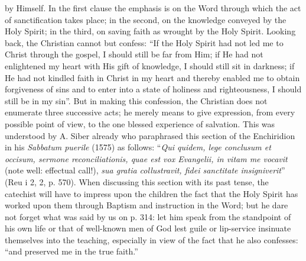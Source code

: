by Himself. In the first clause the emphasis is on the Word through which the act of sanctification takes place; in the second, on the knowledge conveyed by the Holy Spirit; in the third, on saving faith as wrought by the Holy Spirit. Looking back, the Christian cannot but confess: “If the Holy Spirit had not led me to Christ through the gospel, I should still be far from Him; if He had not enlightened my heart with His gift of knowledge, I should still sit in darkness; if He had not kindled faith in Christ in my heart and thereby enabled me to obtain forgiveness of sins and to enter into a state of holiness and righteousness, I should still be in my sin”. But in making this confession, the Christian does not enumerate three successive acts; he merely means to give expression, from every possible point of view, to the one blessed experience of salvation. This was understood by A. Siber already who paraphrased this section of the Enchiridion in his \emph{Sabbatum puerile} (1575) as follows: “\emph{Qui quidem, lege conclusum et occisum, sermone reconciliationis, quae est vox Evangelii, in vitam me vocavit} (note well: effectual call!), \emph{sua gratia collustravit, fidei sanctitate insigniverit}” (Reu i 2, 2, p. 570). When discussing this section with its past tense, the catechist will have to impress upon the children the fact that the Holy Spirit has worked upon them through Baptism and instruction in the Word; but he dare not forget what was said by us on p. 314: let him speak from the standpoint of his own life or that of well-known men of God lest guile or lip-service insinuate themselves into the teaching, especially in view of the fact that he also confesses: “and preserved me in the true faith.”

